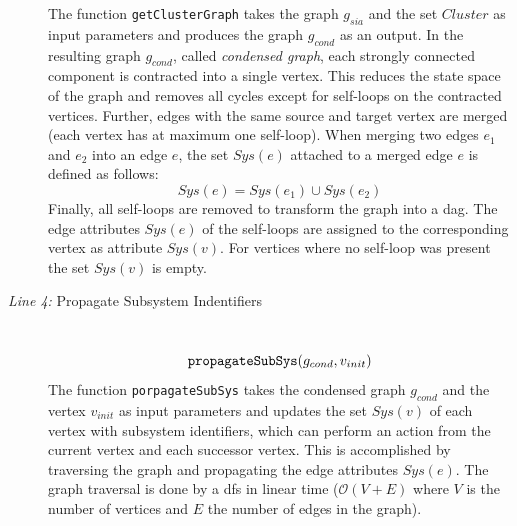\begin{description}
        The function \texttt{getClusterGraph} takes the graph $g_{sia}$ and the set $Cluster$ as input parameters and produces the graph $g_{cond}$ as an output.
        In the resulting graph $g_{cond}$, called \emph{condensed graph}, each strongly connected component is contracted into a single vertex.
        This reduces the state space of the graph and removes all cycles except for self-loops on the contracted vertices.
        Further, edges with the same source and target vertex are merged (\ie each vertex has at maximum one self-loop).
        When merging two edges $e_1$ and $e_2$ into an edge $e$, the set $Sys(e)$ attached to a merged edge $e$ is defined as follows:
        $$ Sys(e) = Sys(e_1) \cup Sys(e_2)$$
        Finally, all self-loops are removed to transform the graph into a \gls{dag}.
        The edge attributes $Sys(e)$ of the self-loops are assigned to the corresponding vertex as attribute $Sys(v)$.
        For vertices where no self-loop was present the set $Sys(v)$ is empty.
    \item[{\normalfont \emph{Line 4:}} Propagate Subsystem Indentifiers] \hfill \\
        $$\textnormal{\tt propagateSubSys}( g_{cond}, v_{init} )$$
        The function \texttt{porpagateSubSys} takes the condensed graph $g_{cond}$ and the vertex $v_{init}$ as input parameters and updates the set $Sys(v)$ of each vertex with subsystem identifiers, which can perform an action from the current vertex and each successor vertex.
        This is accomplished by traversing the graph and propagating the edge attributes $\mathit{Sys}(e)$.
        The graph traversal is done by a \gls{dfs} in linear time ($\mathcal{O}(V+E)$ where $V$ is the number of vertices and $E$ the number of edges in the graph).

\end{description}
